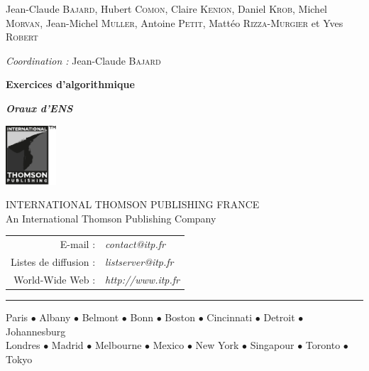\begin{titlepage}
\begin{center}
    {\Large Jean-Claude \textsc{Bajard}, Hubert \textsc{Comon}, Claire \textsc{Kenion}, Daniel \textsc{Krob}, Michel \textsc{Morvan}, Jean-Michel \textsc{Muller}, Antoine \textsc{Petit}, Mattéo \textsc{Rizza-Murgier} et Yves \textsc{Robert}}
    \vspace{.8cm}

    {\Large\textit{Coordination :} Jean-Claude \textsc{Bajard}}
    \vspace{3.3cm}

    {\fontsize{25pt}{0pt}\bfseries Exercices d'algorithmique}
    \vspace{.7cm}

    {\fontsize{18pt}{0pt}\bfseries\itshape Oraux d'ENS}


    \vfill

    \includegraphics[height=2.2cm]{thomson-publishing}
    \smallskip

    \uppercase{International Thomson Publishing France}\\
    An International Thomson Publishing Company
    \medskip

    \begin{tabular}{r l}
        E-mail : & \textit{contact@itp.fr}\\
        Listes de diffusion : & \textit{listserver@itp.fr}\\
        World-Wide Web : & \textit{http://www.itp.fr}
    \end{tabular}
    \hrule\vspace{4pt}
   \textsf{Paris $\bullet$ Albany $\bullet$ Belmont $\bullet$ Bonn $\bullet$ Boston $\bullet$ Cincinnati $\bullet$ Detroit $\bullet$ Johannesburg\\
   Londres $\bullet$ Madrid $\bullet$ Melbourne $\bullet$ Mexico $\bullet$ New York $\bullet$ Singapour $\bullet$ Toronto $\bullet$ Tokyo}
   \end{center}
\end{titlepage}
